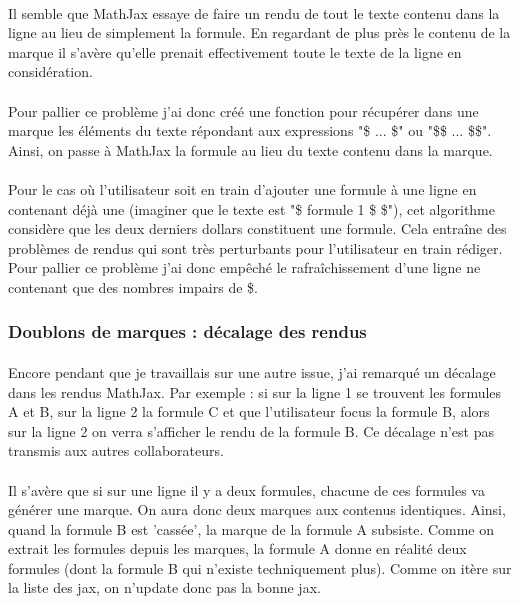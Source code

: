 \documentclass[12pt]{article}
\begin{document}
\paragraph{}
Il semble que MathJax essaye de faire un rendu de tout le texte contenu dans la ligne au lieu de simplement la formule. En regardant de plus près le contenu de la marque il s'avère qu'elle prenait effectivement toute le texte de la ligne en considération.
\paragraph{}
Pour pallier ce problème j'ai donc créé une fonction pour récupérer dans une marque les éléments du texte répondant aux expressions "\$ ... \$" ou "\$\$ ... \$\$". Ainsi, on passe à MathJax la formule au lieu du texte contenu dans la marque.
\paragraph{}
Pour le cas où l'utilisateur soit en train d'ajouter une formule à une ligne en contenant déjà une (imaginer que le texte est "\$ formule 1 \$ \$"), cet algorithme considère que les deux derniers dollars constituent une formule. Cela entraîne des problèmes de rendus qui sont très perturbants pour l'utilisateur en train rédiger. Pour pallier ce problème j'ai donc empêché le rafraîchissement d'une ligne ne contenant que des nombres impairs de \$.\\

\subsubsection{Doublons de marques : décalage des rendus}
\paragraph{}
Encore pendant que je travaillais sur une autre issue, j'ai remarqué un décalage dans les rendus MathJax. Par exemple : si sur la ligne 1 se trouvent les formules A et B, sur la ligne 2 la formule C et que l'utilisateur focus la formule B, alors sur la ligne 2 on verra s'afficher le rendu de la formule B. Ce décalage n'est pas transmis aux autres collaborateurs.
\paragraph{}
Il s'avère que si sur une ligne il y a deux formules, chacune de ces formules va générer une marque. On aura donc deux marques aux contenus identiques. Ainsi, quand la formule B est 'cassée', la marque de la formule A subsiste. Comme on extrait les formules depuis les marques, la formule A donne en réalité deux formules (dont la formule B qui n'existe techniquement plus). Comme on itère sur la liste des jax, on n'update donc pas la bonne jax.
\end{document}
